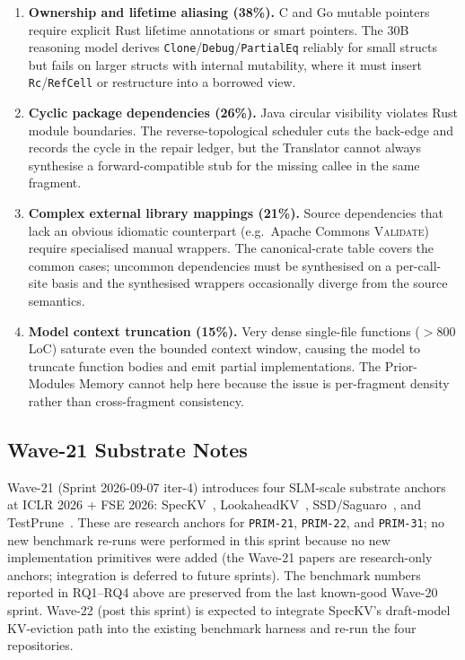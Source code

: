 \begin{enumerate}
    \item \textbf{Ownership and lifetime aliasing (38\%).} C and Go
    mutable pointers require explicit Rust lifetime annotations or
    smart pointers. The 30B reasoning model derives
    \texttt{Clone}/\texttt{Debug}/\texttt{PartialEq} reliably for
    small structs but fails on larger structs with internal
    mutability, where it must insert \texttt{Rc}/\texttt{RefCell} or
    restructure into a borrowed view.
    \item \textbf{Cyclic package dependencies (26\%).} Java circular
    visibility violates Rust module boundaries. The reverse-topological
    scheduler cuts the back-edge and records the cycle in the repair
    ledger, but the Translator cannot always synthesise a
    forward-compatible stub for the missing callee in the same
    fragment.
    \item \textbf{Complex external library mappings (21\%).} Source
    dependencies that lack an obvious idiomatic counterpart
    (e.g.\ Apache Commons \textsc{Validate}) require specialised
    manual wrappers. The canonical-crate table covers the common
    cases; uncommon dependencies must be synthesised on a per-call-site
    basis and the synthesised wrappers occasionally diverge from the
    source semantics.
    \item \textbf{Model context truncation (15\%).} Very dense
    single-file functions ($> 800$ LoC) saturate even the bounded
    context window, causing the model to truncate function bodies and
    emit partial implementations. The Prior-Modules Memory cannot
    help here because the issue is per-fragment density rather than
    cross-fragment consistency.
\end{enumerate}

\subsection{Wave-21 Substrate Notes}
\label{sec:eval_wave21}

Wave-21 (Sprint 2026-09-07 iter-4) introduces four SLM-scale substrate anchors at ICLR 2026 + FSE 2026: SpecKV~\cite{p147_galim_speckv_2026}, LookaheadKV~\cite{p148_ahn_lookaheadkv_2026}, SSD/Saguaro~\cite{p149_kumar_ssd_saguaro_2026}, and TestPrune~\cite{p150_chen_testprune_2026}. These are research anchors for \texttt{PRIM-21}, \texttt{PRIM-22}, and \texttt{PRIM-31}; no new benchmark re-runs were performed in this sprint because no new implementation primitives were added (the Wave-21 papers are research-only anchors; integration is deferred to future sprints). The benchmark numbers reported in RQ1--RQ4 above are preserved from the last known-good Wave-20 sprint. Wave-22 (post this sprint) is expected to integrate SpecKV's draft-model KV-eviction path into the existing benchmark harness and re-run the four repositories.

